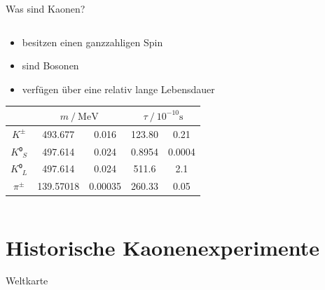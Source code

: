 \documentclass[aspectratio=1610, professionalfonts, 9pt, t]{beamer}
\begin{document}
\begin{frame}{Was sind Kaonen?}
\begin{columns}[onlytextwidth]
\begin{column}{0.5\textwidth}
\begin{itemize}
          \item besitzen einen ganzzahligen Spin
          \item sind Bosonen
          \item verfügen über eine relativ lange Lebensdauer
        \end{itemize}
        \begin{table}
          \centering
          \begin{tabular}{
              S[table-format=6.0]
              S[table-format=3.5]
              @{${}\pm{}$}
              S[table-format=1.5]
              S[table-format=3.4]
              @{${}\pm{}$}
              S[table-format=1.4]
            }
              \toprule
              &  &  \\
              \midrule
              $K^{\pm}$   & 493.677 & 0.016 & 123.80 & 0.21 \\
              $K⁰_{S}$    & 497.614 & 0.024 & 0.8954 & 0.0004 \\
              $K⁰_{L}$    & 497.614 & 0.024 & 511.6  & 2.1 \\
              ${\pi}^{\pm}$ & 139.57018 & 0.00035 & 260.33 & 0.05 \\
              \bottomrule
          \end{tabular}
        \end{table}
      \end{column}
    \end{columns}
  \end{frame}

\section{Historische Kaonenexperimente}
  \begin{frame}{Weltkarte}
  \end{frame}
\end{document}
